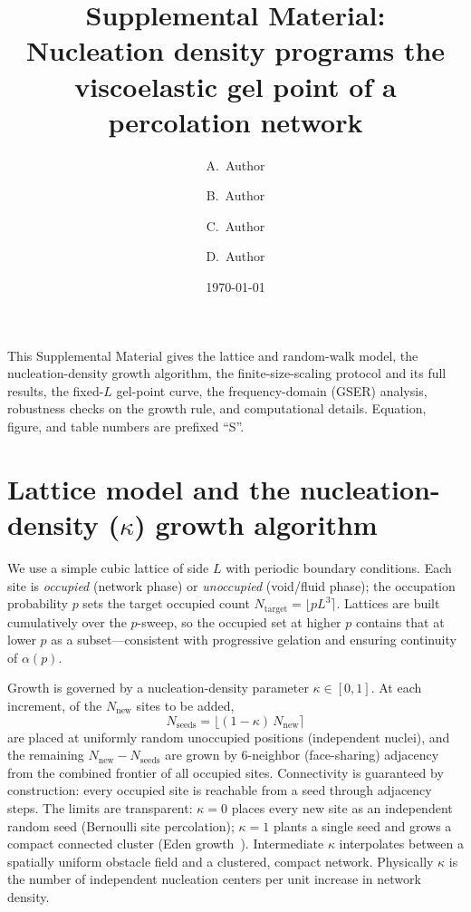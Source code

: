 \documentclass[aps,prl,onecolumn,superscriptaddress,nofootinbib]{revtex4-2}
\newcommand{\kap}{\kappa}
\begin{document}
\title{Supplemental Material:\\ Nucleation density programs the viscoelastic gel point of a percolation network}
\author{A.~Author}
\author{B.~Author}
\author{C.~Author}
\author{D.~Author}
\affiliation{[Affiliation], [Institution], [City], [Country]}
\date{\today}
\maketitle

This Supplemental Material gives the lattice and random-walk model, the nucleation-density
growth algorithm, the finite-size-scaling protocol and its full results, the fixed-$L$
gel-point curve, the frequency-domain (GSER) analysis, robustness checks on the growth rule,
and computational details. Equation, figure, and table numbers are prefixed ``S''.

\section{Lattice model and the nucleation-density ($\kap$) growth algorithm}
We use a simple cubic lattice of side $L$ with periodic boundary conditions. Each site is
\emph{occupied} (network phase) or \emph{unoccupied} (void/fluid phase); the occupation
probability $p$ sets the target occupied count $N_{\mathrm{target}}=\lfloor pL^3\rceil$.
Lattices are built cumulatively over the $p$-sweep, so the occupied set at higher $p$ contains
that at lower $p$ as a subset---consistent with progressive gelation and ensuring continuity of
$\alpha(p)$.

Growth is governed by a nucleation-density parameter $\kap\in[0,1]$. At each increment, of the
$N_{\mathrm{new}}$ sites to be added,
\begin{equation}
  N_{\mathrm{seeds}}=\big\lfloor(1-\kap)\,N_{\mathrm{new}}\big\rceil
\end{equation}
are placed at uniformly random unoccupied positions (independent nuclei), and the remaining
$N_{\mathrm{new}}-N_{\mathrm{seeds}}$ are grown by 6-neighbor (face-sharing) adjacency from the
combined frontier of all occupied sites. Connectivity is guaranteed by construction: every
occupied site is reachable from a seed through adjacency steps. The limits are transparent:
$\kap=0$ places every new site as an independent random seed (Bernoulli site percolation);
$\kap=1$ plants a single seed and grows a compact connected cluster (Eden growth~\cite{Eden1961}).
Intermediate $\kap$ interpolates between a spatially uniform obstacle field and a clustered,
compact network. Physically $\kap$ is the number of independent nucleation centers per unit
increase in network density.
\end{document}
